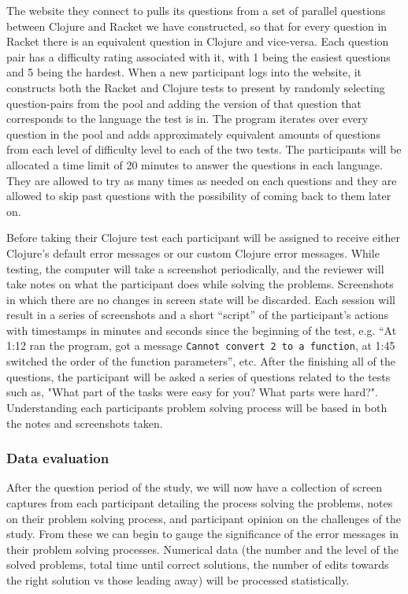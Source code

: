 \documentclass[submission,copyright,creativecommons]{eptcs}
\begin{document}
The website they connect to pulls its questions from a set of parallel questions between Clojure and Racket we have constructed, so that for every question in Racket there is an equivalent question in Clojure and vice-versa.
Each question pair has a difficulty rating associated with it, with 1 being the easiest questions and 5 being the hardest.
When a new participant logs into the website, it constructs both the Racket and Clojure tests to present by randomly selecting question-pairs from the pool and adding the version of that question that corresponds to the language the test is in. 
The program iterates over every question in the pool and adds approximately equivalent amounts of questions from each level of difficulty level to each of the two tests.
	The participants will be allocated a time limit of 20 minutes to answer the questions in each language. 
They are allowed to try as many times as needed on each questions and they are allowed to skip past questions with the possibility of coming back to them later on. 

Before taking their Clojure test each participant will  be assigned to receive either Clojure's default error messages or our custom Clojure error messages.
While testing, the computer will take a screenshot periodically, and the reviewer will take notes on what the participant does while solving the problems.
Screenshots in which there are no changes in screen state will be discarded. 
Each session will result in a series of screenshots and a short ``script'' of the participant's actions with timestamps in minutes and seconds since the beginning of the test, e.g. ``At 1:12 ran the program, got a message \texttt{Cannot convert 2 to a function}, at 1:45 switched the order of the function parameters'', etc.
After the finishing all of the questions, the participant will be asked a series of questions related to the tests such as, "What part of the tasks were easy for you? What parts were hard?".
Understanding each participants problem solving process will be based in both the notes and screenshots taken.

\subsubsection{Data evaluation}\label{subsec:evaluation}

After the question period of the study, we will now have a collection of screen captures from each participant detailing the process solving the problems, notes on their problem solving process, and participant opinion on the challenges of the study.
From these we can begin to gauge the significance of the error messages in their problem solving processes. 
Numerical data (the number and the level of the solved problems, total time until correct solutions, the number of edits towards the right solution vs those leading away) will be processed statistically. 
\end{document}
